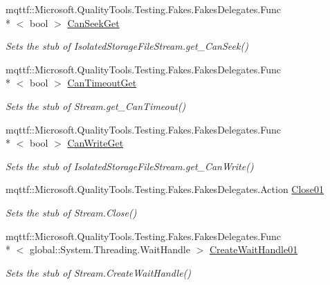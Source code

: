 \begin{DoxyCompactItemize}
mqttf\-::\-Microsoft.\-Quality\-Tools.\-Testing.\-Fakes.\-Fakes\-Delegates.\-Func\\*
$<$ bool $>$ \hyperlink{class_system_1_1_i_o_1_1_isolated_storage_1_1_fakes_1_1_stub_isolated_storage_file_stream_a7bb22d3783f50b68992aede70bd1f092}{Can\-Seek\-Get}
\begin{DoxyCompactList}\small\item\em Sets the stub of Isolated\-Storage\-File\-Stream.\-get\-\_\-\-Can\-Seek()\end{DoxyCompactList}\item 
mqttf\-::\-Microsoft.\-Quality\-Tools.\-Testing.\-Fakes.\-Fakes\-Delegates.\-Func\\*
$<$ bool $>$ \hyperlink{class_system_1_1_i_o_1_1_isolated_storage_1_1_fakes_1_1_stub_isolated_storage_file_stream_a33d39f6710a92a453805c821b432478b}{Can\-Timeout\-Get}
\begin{DoxyCompactList}\small\item\em Sets the stub of Stream.\-get\-\_\-\-Can\-Timeout()\end{DoxyCompactList}\item 
mqttf\-::\-Microsoft.\-Quality\-Tools.\-Testing.\-Fakes.\-Fakes\-Delegates.\-Func\\*
$<$ bool $>$ \hyperlink{class_system_1_1_i_o_1_1_isolated_storage_1_1_fakes_1_1_stub_isolated_storage_file_stream_acaa51ed6ae78655d8931d8fc40d122c3}{Can\-Write\-Get}
\begin{DoxyCompactList}\small\item\em Sets the stub of Isolated\-Storage\-File\-Stream.\-get\-\_\-\-Can\-Write()\end{DoxyCompactList}\item 
mqttf\-::\-Microsoft.\-Quality\-Tools.\-Testing.\-Fakes.\-Fakes\-Delegates.\-Action \hyperlink{class_system_1_1_i_o_1_1_isolated_storage_1_1_fakes_1_1_stub_isolated_storage_file_stream_a1e27013de47e3f666818ff2c4896a75f}{Close01}
\begin{DoxyCompactList}\small\item\em Sets the stub of Stream.\-Close()\end{DoxyCompactList}\item 
mqttf\-::\-Microsoft.\-Quality\-Tools.\-Testing.\-Fakes.\-Fakes\-Delegates.\-Func\\*
$<$ global\-::\-System.\-Threading.\-Wait\-Handle $>$ \hyperlink{class_system_1_1_i_o_1_1_isolated_storage_1_1_fakes_1_1_stub_isolated_storage_file_stream_a35643dbf24ef56c6371a9506248a1dd8}{Create\-Wait\-Handle01}
\begin{DoxyCompactList}\small\item\em Sets the stub of Stream.\-Create\-Wait\-Handle()\end{DoxyCompactList}\item 

\end{DoxyCompactItemize}
